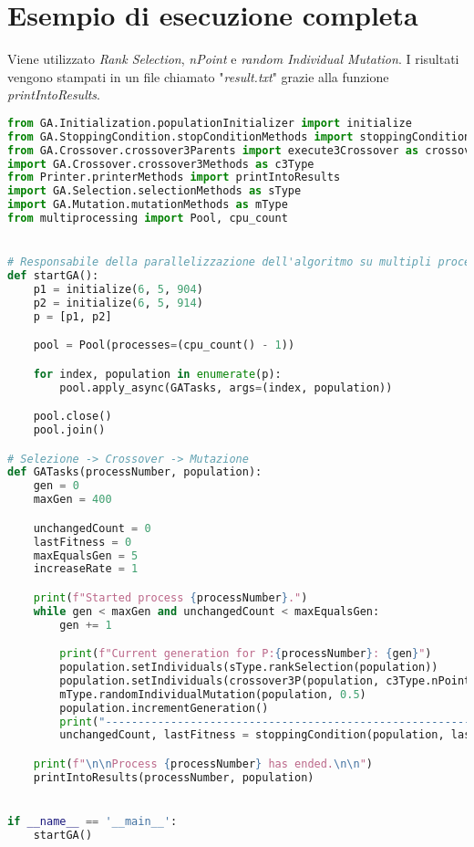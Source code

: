 \documentclass{article}
\begin{document}
\section{Esempio di esecuzione completa}
Viene utilizzato \textit{Rank Selection}, \textit{nPoint} e \textit{random Individual Mutation}. I risultati vengono stampati in un file chiamato "\textit{result.txt}" grazie alla funzione \textit{printIntoResults}.
\begin{lstlisting}[language = Python]
from GA.Initialization.populationInitializer import initialize
from GA.StoppingCondition.stopConditionMethods import stoppingCondition
from GA.Crossover.crossover3Parents import execute3Crossover as crossover3P
import GA.Crossover.crossover3Methods as c3Type
from Printer.printerMethods import printIntoResults
import GA.Selection.selectionMethods as sType
import GA.Mutation.mutationMethods as mType
from multiprocessing import Pool, cpu_count


# Responsabile della parallelizzazione dell'algoritmo su multipli processi
def startGA():
    p1 = initialize(6, 5, 904)
    p2 = initialize(6, 5, 914)
    p = [p1, p2]

    pool = Pool(processes=(cpu_count() - 1))

    for index, population in enumerate(p):
        pool.apply_async(GATasks, args=(index, population))

    pool.close()
    pool.join()

# Selezione -> Crossover -> Mutazione
def GATasks(processNumber, population):
    gen = 0
    maxGen = 400

    unchangedCount = 0
    lastFitness = 0
    maxEqualsGen = 5
    increaseRate = 1

    print(f"Started process {processNumber}.")
    while gen < maxGen and unchangedCount < maxEqualsGen:
        gen += 1

        print(f"Current generation for P:{processNumber}: {gen}")
        population.setIndividuals(sType.rankSelection(population))
        population.setIndividuals(crossover3P(population, c3Type.nPoint, 2))
        mType.randomIndividualMutation(population, 0.5)
        population.incrementGeneration()
        print("--------------------------------------------------------------------")
        unchangedCount, lastFitness = stoppingCondition(population, lastFitness, unchangedCount, increaseRate)

    print(f"\n\nProcess {processNumber} has ended.\n\n")
    printIntoResults(processNumber, population)


if __name__ == '__main__':
    startGA()
\end{lstlisting}
\end{document}

